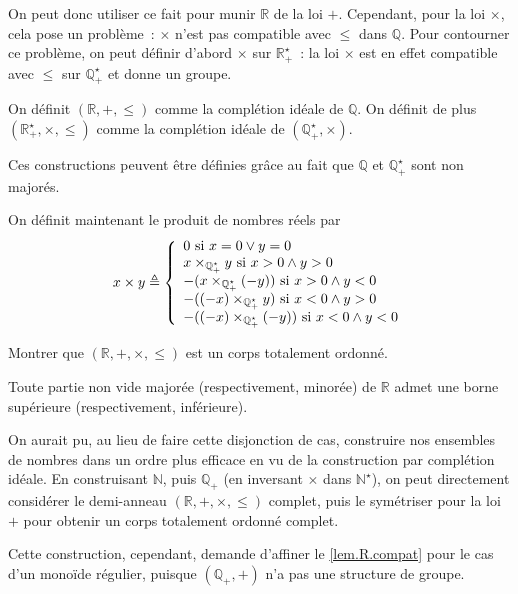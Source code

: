 On peut donc utiliser ce fait pour munir $\mathbb R$ de la loi $+$. Cependant,
pour la loi $\times$, cela pose un problème~: $\times$ n'est pas compatible avec
$\leq$ dans $\mathbb Q$. Pour contourner ce problème, on peut définir d'abord
$\times$ sur $\mathbb R_+^\star$~: la loi $\times$ est en effet compatible
avec $\leq$ sur $\mathbb Q_+^\star$ et donne un groupe.

\begin{definition}
  On définit $(\mathbb R,+,\leq)$ comme la complétion idéale de $\mathbb Q$.
  On définit de plus $(\mathbb R_+^\star,\times, \leq)$ comme la complétion
  idéale de $(\mathbb Q_+^\star,\times)$.
\end{definition}

\begin{remark}
  Ces constructions peuvent être définies grâce au fait que $\mathbb Q$ et
  $\mathbb Q_+^\star$ sont non majorés.
\end{remark}

\begin{definition}
  On définit maintenant le produit de nombres réels par
  \[x \times y \triangleq \left\{\begin{array}{l}
  0 \text{ si } x = 0 \lor y = 0 \\
  x \times_{\mathbb Q_+^\star} y \text{ si } x > 0 \land y > 0\\
  - (x \times_{\mathbb Q_+^\star} (-y)) \text{ si } x > 0 \land y < 0\\
  - ((-x) \times_{\mathbb Q_+^\star} y) \text{ si } x < 0 \land y > 0\\
  - ((-x) \times_{\mathbb Q_+^\star} (-y)) \text{ si } x < 0 \land y < 0
  \end{array}\right.\]
\end{definition}

\begin{exercise}
  Montrer que $(\mathbb R,+,\times,\leq)$ est un corps totalement ordonné.
\end{exercise}

\begin{corollary}
  Toute partie non vide majorée (respectivement, minorée) de $\mathbb R$ admet
  une borne supérieure (respectivement, inférieure).
\end{corollary}

\begin{remark}
  On aurait pu, au lieu de faire cette disjonction de cas, construire nos
  ensembles de nombres dans un ordre plus efficace en vu de la construction par
  complétion idéale. En construisant $\mathbb N$, puis $\mathbb Q_+$ (en
  inversant $\times$ dans $\mathbb N^\star$), on peut directement considérer le
  demi-anneau $(\mathbb R,+,\times,\leq)$ complet, puis le symétriser pour la
  loi $+$ pour obtenir un corps totalement ordonné complet.

  Cette construction, cependant, demande d'affiner le \cref{lem.R.compat} pour
  le cas d'un monoïde régulier, puisque $(\mathbb Q_+,+)$ n'a pas une structure
  de groupe.
\end{remark}

